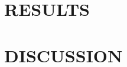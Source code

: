 \documentclass[letterpaper, 10 pt, conference]{ieeeconf}  %
\begin{document}
\section{RESULTS}

\section{DISCUSSION}

\addtolength{\textheight}{-12cm}   %







\end{document}
